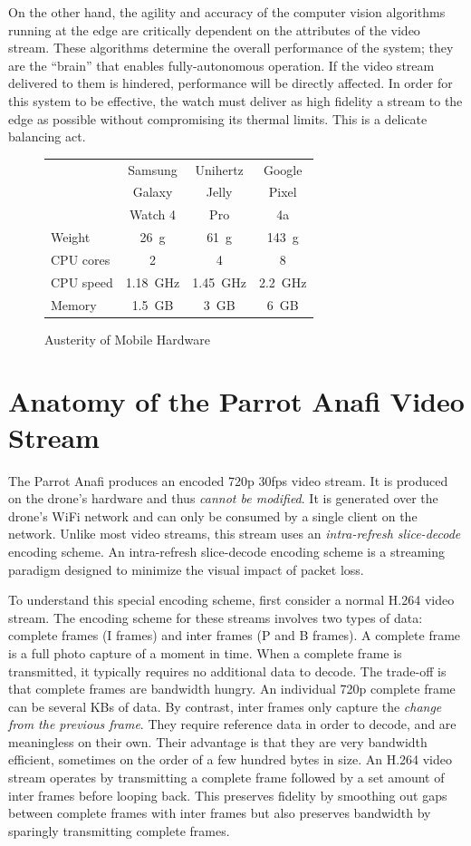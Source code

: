 On the other hand, the agility and accuracy of the computer vision algorithms running at the edge are critically dependent on the attributes of the video stream. These algorithms determine the overall performance of the system; they are the ``brain'' that enables fully-autonomous operation. If the video stream delivered to them is hindered, performance will be directly affected. In order for this system to be effective, the watch must deliver as high fidelity a stream to the edge as possible without compromising its thermal limits. This is a delicate balancing act.

\begin{figure}
\centering
\begin{tabular}{|l|c|c|c|}
\hline
    & Samsung & Unihertz & Google \\
    & Galaxy & Jelly & Pixel\\
    & Watch 4 & Pro & 4a \\
\hline
Weight & 26~g & 61~g & 143~g\\
CPU cores & 2 & 4 & 8 \\
CPU speed & 1.18~GHz&1.45~GHz & 2.2~GHz\\
Memory & 1.5~GB & 3~GB & 6~GB\\
\hline
\end{tabular}
\caption{Austerity of Mobile Hardware}
\label{tab:austerity}
\end{figure}

\section{Anatomy of the Parrot Anafi Video Stream}
\label{sec:anatomy-drone-stream}
The Parrot Anafi produces an encoded 720p 30fps video stream. It is produced on the drone's hardware and thus \textit{cannot be modified}. It is generated over the drone's WiFi network and can only be consumed by a single client on the network. Unlike most video streams, this stream uses an \textit{intra-refresh slice-decode} encoding scheme. An intra-refresh slice-decode encoding scheme is a streaming paradigm designed to minimize the visual impact of packet loss. 

To understand this special encoding scheme, first consider a normal H.264 video stream. The encoding scheme for these streams involves two types of data: complete frames (I frames) and inter frames (P and B frames). A complete frame is a full photo capture of a moment in time. When a complete frame is transmitted, it typically requires no additional data to decode. The trade-off is that complete frames are bandwidth hungry. An individual 720p complete frame can be several KBs of data. By contrast, inter frames only capture the \textit{change from the previous frame}. They require reference data in order to decode, and are meaningless on their own. Their advantage is that they are very bandwidth efficient, sometimes on the order of a few hundred bytes in size. An H.264 video stream operates by transmitting a complete frame followed by a set amount of inter frames before looping back. This preserves fidelity by smoothing out gaps between complete frames with inter frames but also preserves bandwidth by sparingly transmitting complete frames.

